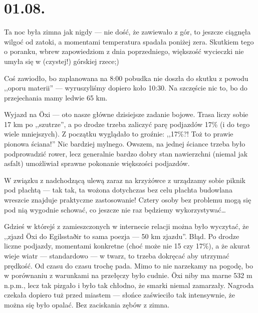 \chapter*{01.08.}

Ta noc była zimna jak nigdy --- nie dość, że zawiewało z gór, to jeszcze ciągnęła wilgoć od zatoki, a momentami temperatura spadała poniżej zera. Skutkiem tego o poranku, wbrew zapowiedziom z dnia poprzedniego, większość wycieczki nie umyła się w (czystej!) górskiej rzece;)


Coś zawiodło, bo zaplanowana na 8:00 pobudka nie doszła do skutku z powodu ,,oporu materii'' --- wyruszyliśmy dopiero koło 10:30. Na szczęście nic to, bo do przejechania mamy ledwie 65 km.

Wyjazd na Öxi --- oto nasze główne dzisiejsze zadanie bojowe. Trasa liczy sobie 17 km po ,,szutrze'', a po drodze trzeba zaliczyć parę podjazdów 17\% (i do tego wiele mniejszych). Z początku wyglądało to groźnie: ,,17\%?! Toż to prawie pionowa ściana!'' Nic bardziej mylnego. Owszem, na jednej ściance trzeba było podprowadzić rower, lecz generalnie bardzo dobry stan nawierzchni (niemal jak asfalt) umożliwiał sprawne pokonanie większości podjazdów.


W związku z nadchodzącą ulewą zaraz na krzyżówce z  urządzamy sobie piknik pod płachtą --- tak tak, ta wożona dotychczas bez celu płachta budowlana wreszcie znajduje praktyczne zastosowanie! Cztery osoby bez problemu mogą się pod nią wygodnie schować, co jeszcze nie raz będziemy wykorzystywać…

Gdzieś w którejś z zamieszczonych w internecie relacji można było wyczytać, że ,,zjazd Öxi do Egilsstaðir to sama poezja --- 50 km zjazdu''. Błąd. Po drodze liczne podjazdy, momentami konkretne (choć może nie 15 czy 17\%), a że akurat wieje wiatr --- standardowo --- w twarz, to trzeba dokręcać aby utrzymać prędkość. Od czasu do czasu trochę pada. Mimo to nie narzekamy na pogodę, bo w porównaniu z warunkami na przełęczy było cudnie. Öxi niby ma marne 532 m n.p.m., lecz tak pizgało i było tak chłodno, że smarki niemal zamarzały. Nagroda czekała dopiero tuż przed miastem --- słońce zaświeciło tak intensywnie, że można się było opalać. Bez zaciskania zębów z zimna.


